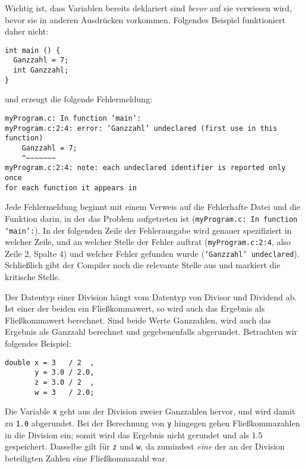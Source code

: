 Wichtig ist, dass Variablen bereits deklariert sind \emph{bevor} auf sie verwiesen wird, \ie bevor sie in anderen Ausdrücken vorkommen. Folgendes Beispiel funktioniert daher nicht:
\begin{codebox}
\begin{verbatim}
int main () {
  Ganzzahl = 7;
  int Ganzzahl;
}
\end{verbatim}
\end{codebox}
und erzeugt die folgende Fehlermeldung:
\begin{cmdbox}
\begin{verbatim}
myProgram.c: In function ‘main’:
myProgram.c:2:4: error: ‘Ganzzahl’ undeclared (first use in this 
function)
    Ganzzahl = 7;
    ^~~~~~~~
myProgram.c:2:4: note: each undeclared identifier is reported only once 
for each function it appears in
\end{verbatim}
\end{cmdbox}
Jede Fehlermeldung beginnt mit einem Verweis auf die Fehlerhafte Datei und die Funktion darin, in der das Problem aufgetreten ist (\texttt{myProgram.c: In function ‘main’:}). In der folgenden Zeile der Fehlerausgabe wird genauer spezifiziert in welcher Zeile, und an welcher Stelle der Fehler auftrat (\texttt{myProgram.c:2:4}, also  Zeile 2, Spalte 4) und welcher Fehler gefunden wurde (\texttt{‘Ganzzahl’ undeclared}). Schließlich gibt der Compiler noch die relevante Stelle aus und markiert die kritische Stelle.

\begin{hintbox}
Der Datentyp einer Division hängt vom Datentyp von Divisor und Dividend ab. Ist einer der beiden ein Fließkommawert, so wird auch das Ergebnis als Fließkommawert berechnet. Sind beide Werte Ganzzahlen, wird auch das Ergebnis als Ganzzahl berechnet und gegebenenfalls abgerundet. Betrachten wir folgendes Beispiel:
\begin{codebox}
\begin{verbatim}
double x = 3   / 2  ,
       y = 3.0 / 2.0,
       z = 3.0 / 2  ,
       w = 3   / 2.0;
\end{verbatim}
\end{codebox}
Die Variable \texttt{x} geht aus der Division zweier Ganzzahlen hervor, und wird damit zu \texttt{1.0} abgerundet. Bei der Berechnung von \texttt{y} hingegen gehen Fließkommazahlen in die Division ein; somit wird das Ergebnis nicht gerundet und als 1.5 gespeichert. Dasselbe gilt für \texttt{z} und \texttt{w}, da zumindest \emph{eine} der an der Division beteiligten Zahlen eine Fließkommazahl war.
\end{hintbox}

